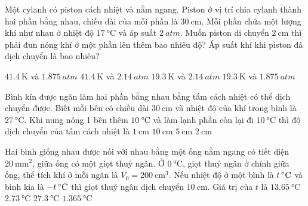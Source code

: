 \begin{ex}
Một cylanh có piston cách nhiệt và nằm ngang. Piston ở vị trí chia cylanh thành hai phần bằng nhau, chiều dài của mỗi phần là $\SI{30}{\centi\meter}$. Mỗi phần chứa một lượng khí như nhau ở nhiệt độ $\SI{17}{\celsius}$ và áp suất $\SI{2}{atm}$. Muốn piston di chuyển $\SI{2}{\centi\meter}$ thì phải đun nóng khí ở một phần lên thêm bao nhiêu độ? Áp suất khí khi piston đã dịch chuyển là bao nhiêu?
	
	\choice
	{$\SI{41.4}{\kelvin}$ và $\SI{1.875}{atm}$}
	{\True $\SI{41.4}{\kelvin}$ và $\SI{2.14}{atm}$}
	{$\SI{19.3}{\kelvin}$ và $\SI{2.14}{atm}$}
	{$\SI{19.3}{\kelvin}$ và $\SI{1.875}{atm}$}
\end{ex}
\begin{ex}
	Bình kín được ngăn làm hai phần bằng nhau bằng tấm cách nhiệt có thể dịch chuyển được. Biết mỗi bên có chiều dài $\SI{30}{\centi\meter}$ và nhiệt độ của khí trong bình là $\SI{27}{\celsius}$. Khi nung nóng 1 bên thêm $\SI{10}{\celsius}$ và làm lạnh phần còn lại đi $\SI{10}{\celsius}$ thì độ dịch chuyển của tấm cách nhiệt là
	\choice
	{\True $\SI{1}{\centi\meter}$}
	{$\SI{10}{\centi\meter}$}
	{$\SI{5}{\centi\meter}$}
	{$\SI{2}{\centi\meter}$}
\end{ex}
\begin{ex}
Hai bình giống nhau được nối với nhau bằng một ống nằm ngang có tiết diện $\SI{20}{\milli\meter^2}$, giữa ống có một giọt thuỷ ngân. Ở $\SI{0}{\celsius}$, giọt thuỷ ngân ở chính giữa ống, thể tích khí ở mỗi ngăn là $V_0=\SI{200}{\centi\meter^3}$. Nếu nhiệt độ ở một bình là $\xsi{t}{\celsius}$ và bình kia là $\xsi{-t}{\celsius}$ thì giọt thuỷ ngân dịch chuyển $\SI{10}{\centi\meter}$. Giá trị của $t$ là	
	\choice
	{$\SI{13.65}{\celsius}$}
	{\True $\SI{2.73}{\celsius}$}
	{$\SI{27.3}{\celsius}$}
	{$\SI{1.365}{\celsius}$}
\end{ex}
